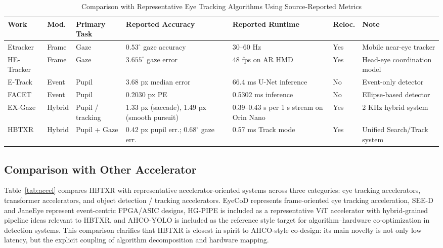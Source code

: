 \documentclass[journal]{IEEEtran}
\begin{document}
\begin{table}[t]
\caption{Comparison with Representative Eye Tracking Algorithms Using Source-Reported Metrics}
\label{tab:prior}
\centering
\footnotesize
\begin{tabular}{p{}p{}p{}p{}p{}p{}p{}}
\toprule
Work & Mod. & Primary Task & Reported Accuracy & Reported Runtime & Reloc. & Note \\
\midrule
Etracker & Frame & Gaze & $0.53^{\circ}$ gaze accuracy & 30--60 Hz & Yes & Mobile near-eye tracker \\
HE-Tracker & Frame & Gaze & $3.655^{\circ}$ gaze error & 48 fps on AR HMD & Yes & Head-eye coordination model \\
E-Track & Event & Pupil & 3.68 px median error & 66.4 ms U-Net inference & No & Event-only detector \\
FACET & Event & Pupil & 0.2030 px PE & 0.5302 ms inference & No & Ellipse-based detector \\
EX-Gaze & Hybrid & Pupil / tracking & 1.33 px (saccade), 1.49 px (smooth pursuit) & 0.39--0.43 s per 1 s stream on Orin Nano & Yes & 2 KHz hybrid system \\
HBTXR & Hybrid & Pupil + Gaze & 0.42 px pupil err.; $0.68^{\circ}$ gaze err. & 0.57 ms Track mode & Yes & Unified Search/Track system \\
\bottomrule
\end{tabular}
\end{table}

\subsection{Comparison with Other Accelerator}
Table~\ref{tab:accel} compares HBTXR with representative accelerator-oriented systems across three categories: eye tracking accelerators, transformer accelerators, and object detection / tracking accelerators. EyeCoD represents frame-oriented eye tracking acceleration, SEE-D and JaneEye represent event-centric FPGA/ASIC designs, HG-PIPE is included as a representative ViT accelerator with hybrid-grained pipeline ideas relevant to HBTXR, and AHCO-YOLO is included as the reference style target for algorithm--hardware co-optimization in detection systems. This comparison clarifies that HBTXR is closest in spirit to AHCO-style co-design: its main novelty is not only low latency, but the explicit coupling of algorithm decomposition and hardware mapping.
\end{document}
